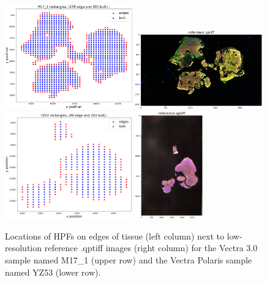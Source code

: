 \documentclass[letterpaper,11pt]{article}
\begin{document}
\begin{figure}[!ht]
\centering
\includegraphics[width=0.49\textwidth]{images/masking/rectangle_locations_M17_1}
\includegraphics[width=0.49\textwidth]{images/masking/reference_qptiff_M17_1}
\includegraphics[width=0.49\textwidth]{images/masking/rectangle_locations_YZ53}
\hspace{1.7cm}
\includegraphics[width=0.26\textwidth]{images/masking/reference_qptiff_YZ53}
\hspace{1.7cm}
\caption{\footnotesize Locations of HPFs on edges of tissue (left column) next to low-resolution reference .qptiff images (right column) for the Vectra 3.0 sample named M17\_1 (upper row) and the Vectra Polaris sample named YZ53 (lower row). }
\label{fig:edge_HPFs}
\end{figure}
\end{document}
